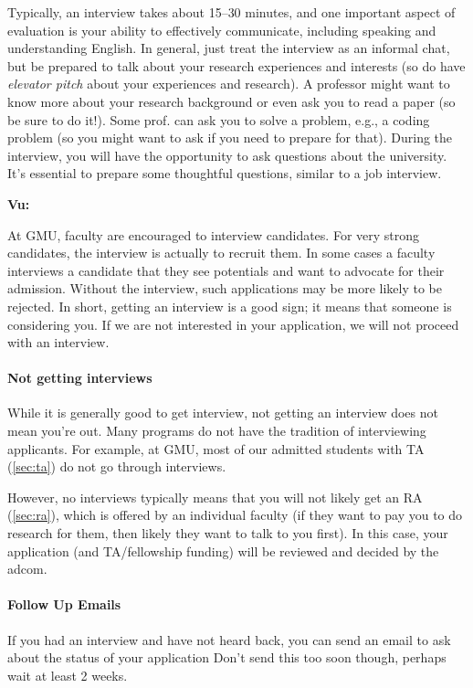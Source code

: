 \documentclass[oneside,11pt]{book}
\newenvironment{commentbox}[1][]{
  \small
  \begin{mybox}
    {\small \textbf{#1}}
  }{
  \end{mybox}
}
\begin{document}
Typically, an interview takes about 15--30 minutes, and one important aspect of evaluation is your ability to effectively communicate, including speaking and understanding English. 
In general, just treat the interview as an informal chat, but be prepared to talk about your research experiences and interests (so do have \emph{elevator pitch} about your experiences and research). 
A professor might want to know more about your research background or even ask you to read a paper (so be sure to do it!). Some prof. can ask you to solve a problem, e.g., a coding problem (so you might want to ask if you need to prepare for that).
During the interview, you will have the opportunity to ask questions about the university. It's essential to prepare some thoughtful questions, similar to a job interview.

\begin{commentbox}[Vu:]
  At GMU, faculty are encouraged to interview candidates. For very strong candidates, the interview is actually to recruit them.  In some cases a faculty interviews a candidate that they see potentials and want to advocate for their admission. Without the interview, such applications may be more likely to be rejected.
  \tcblower
  In short, getting an interview is a good sign; it means that someone is considering you. If we are not interested in your application, we will not proceed with an interview.
\end{commentbox}

\paragraph{Not getting interviews} While it is generally good to get interview, not getting an interview does not mean you're out.  Many programs do not have the tradition of interviewing applicants. For example, at GMU, most of our admitted students with TA (\autoref{sec:ta}) do not go through interviews. 

However, no interviews typically means that you will not likely get an RA (\autoref{sec:ra}), which is offered by an individual faculty (if they want to pay you to do research for them, then likely they want to talk to you first).  In this case, your application (and TA/fellowship funding) will be reviewed and decided by the adcom.

\paragraph{Follow Up Emails} If you had an interview and have not heard back, you can send an email to ask about the status of your application Don't send this too soon though, perhaps wait at least 2 weeks. 
\end{document}
